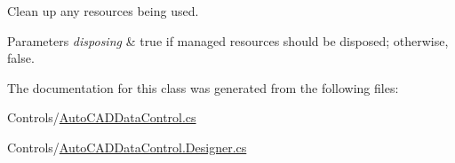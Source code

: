 Clean up any resources being used. 


\begin{DoxyParams}{Parameters}
{\em disposing} & true if managed resources should be disposed; otherwise, false.\\
\hline
\end{DoxyParams}


The documentation for this class was generated from the following files\+:\begin{DoxyCompactItemize}
\item 
Controls/\hyperlink{_auto_c_a_d_data_control_8cs}{Auto\+C\+A\+D\+Data\+Control.\+cs}\item 
Controls/\hyperlink{_auto_c_a_d_data_control_8_designer_8cs}{Auto\+C\+A\+D\+Data\+Control.\+Designer.\+cs}\end{DoxyCompactItemize}
